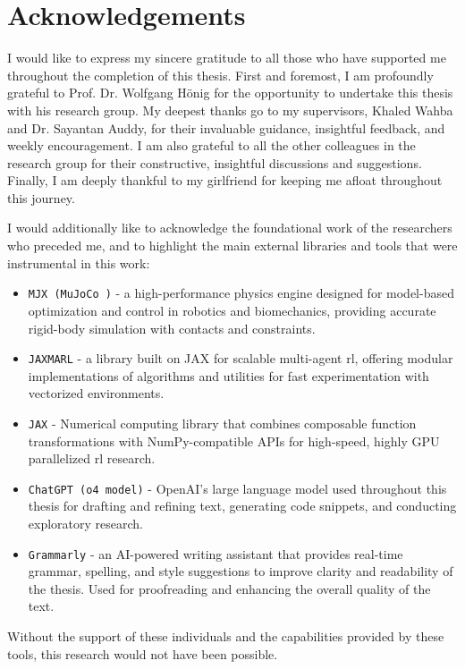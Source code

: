 \chapter*{Acknowledgements}
\thispagestyle{empty}

I would like to express my sincere gratitude to all those who have supported me throughout the completion of this thesis. First and foremost, I am profoundly grateful to Prof. Dr. Wolfgang Hönig for the opportunity to undertake this thesis with his research group. My deepest thanks go to my supervisors, Khaled Wahba and Dr. Sayantan Auddy, for their invaluable guidance, insightful feedback, and weekly encouragement. I am also grateful to all the other colleagues in the research group for their constructive, insightful discussions and suggestions. Finally, I am deeply thankful to my girlfriend for keeping me afloat throughout this journey.

I would additionally like to acknowledge the foundational work of the researchers who preceded me, and to highlight the main external libraries and tools that were instrumental in this work:

\begin{itemize}
  \item \texttt{MJX (MuJoCo \cite{todorov2012mujoco})} - a high-performance physics engine designed for model-based optimization and control in robotics and biomechanics, providing accurate rigid-body simulation with contacts and constraints.
  \item \texttt{JAXMARL} \cite{flair2023jaxmarl}  - a library built on JAX for scalable multi-agent \gls{rl}, offering modular implementations of algorithms and utilities for fast experimentation with vectorized environments.
  \item \texttt{JAX} \cite{jax2018github} - Numerical computing library that combines composable function transformations with NumPy-compatible APIs for high-speed, highly GPU parallelized \gls{rl} research.
  \item \texttt{ChatGPT (o4 model)} - OpenAI's large language model used throughout this thesis for drafting and refining text, generating code snippets, and conducting exploratory research.
  \item \texttt{Grammarly} - an AI-powered writing assistant that provides real-time grammar, spelling, and style suggestions to improve clarity and readability of the thesis. Used for proofreading and enhancing the overall quality of the text.
\end{itemize}

\vspace{1em}
\noindent
Without the support of these individuals and the capabilities provided by these tools, this research would not have been possible.
